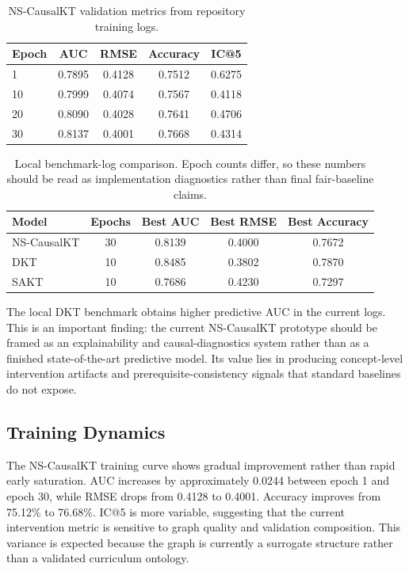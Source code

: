 \documentclass[conference]{IEEEtran}
\begin{document}
\begin{table}[t]
\centering
\caption{NS-CausalKT validation metrics from repository training logs.}
\label{tab:main-results}
\begin{tabular}{lcccc}
\toprule
Epoch & AUC & RMSE & Accuracy & IC@5 \\
\midrule
1 & 0.7895 & 0.4128 & 0.7512 & 0.6275 \\
10 & 0.7999 & 0.4074 & 0.7567 & 0.4118 \\
20 & 0.8090 & 0.4028 & 0.7641 & 0.4706 \\
30 & 0.8137 & 0.4001 & 0.7668 & 0.4314 \\
\bottomrule
\end{tabular}
\end{table}

\begin{table}[t]
\centering
\caption{Local benchmark-log comparison. Epoch counts differ, so these numbers should be read as implementation diagnostics rather than final fair-baseline claims.}
\label{tab:benchmarks}
\begin{tabular}{lcccc}
\toprule
Model & Epochs & Best AUC & Best RMSE & Best Accuracy \\
\midrule
NS-CausalKT & 30 & 0.8139 & 0.4000 & 0.7672 \\
DKT & 10 & 0.8485 & 0.3802 & 0.7870 \\
SAKT & 10 & 0.7686 & 0.4230 & 0.7297 \\
\bottomrule
\end{tabular}
\end{table}

The local DKT benchmark obtains higher predictive AUC in the current logs. This is an important finding: the current NS-CausalKT prototype should be framed as an explainability and causal-diagnostics system rather than as a finished state-of-the-art predictive model. Its value lies in producing concept-level intervention artifacts and prerequisite-consistency signals that standard baselines do not expose.

\subsection{Training Dynamics}
The NS-CausalKT training curve shows gradual improvement rather than rapid early saturation. AUC increases by approximately 0.0244 between epoch 1 and epoch 30, while RMSE drops from 0.4128 to 0.4001. Accuracy improves from 75.12\% to 76.68\%. IC@5 is more variable, suggesting that the current intervention metric is sensitive to graph quality and validation composition. This variance is expected because the graph is currently a surrogate structure rather than a validated curriculum ontology.
\end{document}
